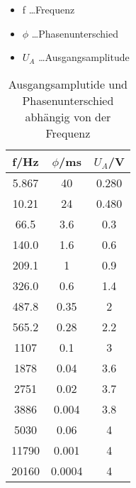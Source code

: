 \documentclass[a4paper]{article}
\begin{document}
\begin{table}[ht]
  \centering
  \caption{Ausgangsamplutide und Phasenunterschied abhängig von der Frequenz}
  \begin{itemize}
    \item f \dots Frequenz
    \item $\phi$ \dots Phasenunterschied
    \item $U_A$ \dots Ausgangsamplitude
  \end{itemize}
  \begin{tabular}{|c|c|c|}
    \hline
    f/Hz&$\phi$/ms&$U_A$/V\\
    \hline
    5.867&40&0.280\\
    \hline
    10.21&24&0.480\\
    \hline
    66.5&3.6&0.3\\
    \hline
    140.0&1.6&0.6\\
    \hline
    209.1&1&0.9\\
    \hline
    326.0&0.6&1.4\\
    \hline
    487.8&0.35&2\\
    \hline
    565.2&0.28&2.2\\
    \hline
    1107&0.1&3\\
    \hline
    1878&0.04&3.6\\
    \hline
    2751&0.02&3.7\\
    \hline
    3886&0.004&3.8\\
    \hline
    5030&0.06&4\\
    \hline
    11790&0.001&4\\
    \hline
    20160&0.0004&4\\
    \hline
  \end{tabular}
  \label{tab:1}
\end{table}
\newpage
\end{document}
